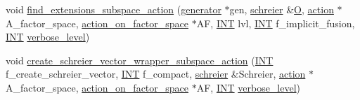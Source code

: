 \begin{DoxyCompactItemize}
\item 
void \mbox{\hyperlink{classoracle_a7fde1637fd91cd998a4857c135a6c512}{find\+\_\+extensions\+\_\+subspace\+\_\+action}} (\mbox{\hyperlink{classgenerator}{generator}} $\ast$gen, \mbox{\hyperlink{classschreier}{schreier}} \&\mbox{\hyperlink{pentomino__5x5_8_c_a0824fca46b94fc0ff4ae72f3c56481aa}{O}}, \mbox{\hyperlink{classaction}{action}} $\ast$A\+\_\+factor\+\_\+space, \mbox{\hyperlink{classaction__on__factor__space}{action\+\_\+on\+\_\+factor\+\_\+space}} $\ast$AF, \mbox{\hyperlink{galois_8h_a09fddde158a3a20bd2dcadb609de11dc}{I\+NT}} lvl, \mbox{\hyperlink{galois_8h_a09fddde158a3a20bd2dcadb609de11dc}{I\+NT}} f\+\_\+implicit\+\_\+fusion, \mbox{\hyperlink{galois_8h_a09fddde158a3a20bd2dcadb609de11dc}{I\+NT}} \mbox{\hyperlink{simeon_8_c_a818073fbcc2f439e7c56952f67386122}{verbose\+\_\+level}})
\item 
void \mbox{\hyperlink{classoracle_a250fe1c81f6109c01b0b030ccba537b3}{create\+\_\+schreier\+\_\+vector\+\_\+wrapper\+\_\+subspace\+\_\+action}} (\mbox{\hyperlink{galois_8h_a09fddde158a3a20bd2dcadb609de11dc}{I\+NT}} f\+\_\+create\+\_\+schreier\+\_\+vector, \mbox{\hyperlink{galois_8h_a09fddde158a3a20bd2dcadb609de11dc}{I\+NT}} f\+\_\+compact, \mbox{\hyperlink{classschreier}{schreier}} \&Schreier, \mbox{\hyperlink{classaction}{action}} $\ast$A\+\_\+factor\+\_\+space, \mbox{\hyperlink{classaction__on__factor__space}{action\+\_\+on\+\_\+factor\+\_\+space}} $\ast$AF, \mbox{\hyperlink{galois_8h_a09fddde158a3a20bd2dcadb609de11dc}{I\+NT}} \mbox{\hyperlink{simeon_8_c_a818073fbcc2f439e7c56952f67386122}{verbose\+\_\+level}})
\end{DoxyCompactItemize}

